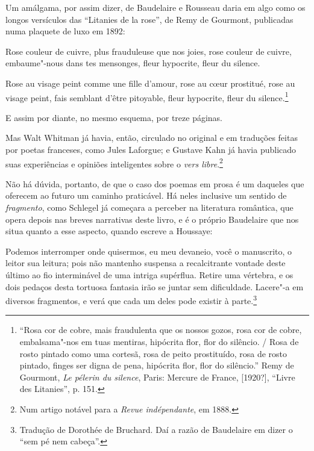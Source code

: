 Um amálgama, por assim dizer, de Baudelaire e Rousseau daria em algo
como os longos versículos das ``Litanies de la rose'', de Remy de
Gourmont, publicadas numa plaquete de luxo em 1892:

\begin{hedraquote}
Rose couleur de cuivre, plus frauduleuse que nos joies, rose couleur de
cuivre, embaume"-nous dans tes mensonges, fleur hypocrite, fleur du
silence.

Rose au visage peint comme une fille d’amour, rose au
cœur prostitué, rose au visage peint, fais semblant
d’être pitoyable, fleur hypocrite, fleur du
silence.\footnote{ “Rosa cor de cobre, mais fraudulenta que os nossos gozos, rosa cor de
cobre, embalsama"-nos em tuas mentiras, hipócrita flor, flor do
silêncio. / Rosa de rosto pintado como uma cortesã, rosa de peito prostituído, rosa
de rosto pintado, finges ser digna de pena, hipócrita flor, flor do
silêncio.” Remy de Gourmont,  \textit{Le pélerin du silence}, Paris:
Mercure de France, [1920?], “Livre des Litanies”, p. 151.}
\end{hedraquote}

E assim por diante, no mesmo esquema, por treze páginas.

Mas Walt Whitman já havia, então, circulado no original e em traduções
feitas por poetas franceses, como Jules Laforgue; e Gustave Kahn já
havia publicado suas experiências e opiniões inteligentes sobre o
\textit{vers libre}.\footnote{ Num artigo notável para a \textit{Revue
indépendante}, em 1888.}

Não há dúvida, portanto, de que o caso dos poemas em prosa é um
daqueles que oferecem ao futuro um caminho praticável. Há
neles inclusive um sentido de \textit{fragmento}, como Schlegel já
começara a perceber na literatura romântica, que opera depois nas
breves narrativas deste livro, e é o próprio Baudelaire que nos situa
quanto a esse aspecto, quando escreve a Houssaye: 

\begin{hedraquote}
Podemos interromper
onde quisermos, eu meu devaneio, você o manuscrito, o leitor sua
leitura; pois não mantenho suspensa a recalcitrante vontade deste
último ao fio interminável de uma intriga supérflua. Retire uma
vértebra, e os dois pedaços desta tortuosa fantasia irão se juntar sem
dificuldade. Lacere"-a em diversos fragmentos, e verá que cada um
deles pode existir à parte.\footnote{ Tradução de Dorothée de Bruchard.
Daí a razão de Baudelaire em dizer o “sem pé nem cabeça”.} 
\end{hedraquote}

